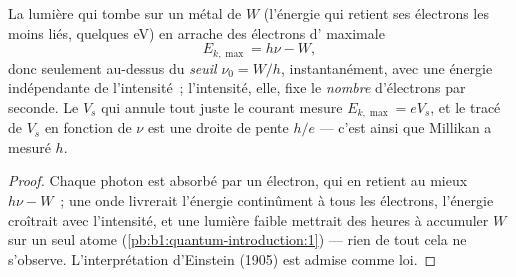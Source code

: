 \begin{proposition}\label{prop:b1:quantum-introduction:photoelectric}
La lumière qui tombe sur un métal de \emph{} $W$
(l'énergie qui retient ses électrons les moins liés, quelques eV) en
arrache des électrons d' maximale
\[
E_{k,\max} = h\nu - W ,
\]
donc seulement au-dessus du \emph{seuil} $\nu_0 = W/h$, instantanément,
avec une énergie indépendante de l'intensité~; l'intensité, elle, fixe le
\emph{nombre} d'électrons par seconde. Le \emph{}
$V_s$ qui annule tout juste le courant mesure $E_{k,\max} = eV_s$, et
le tracé de $V_s$ en fonction de $\nu$ est une droite de pente $h/e$ ---
c'est ainsi que Millikan a mesuré $h$.
\end{proposition}

\begin{proof}
Chaque photon est absorbé par un électron, qui en retient au mieux
$h\nu - W$~; une onde livrerait l'énergie continûment à tous les
électrons, l'énergie croîtrait avec l'intensité, et une lumière faible
mettrait des heures à accumuler $W$ sur un seul atome
(\cref{pb:b1:quantum-introduction:1}) --- rien de tout cela ne s'observe.
L'interprétation d'Einstein (1905) est admise comme loi.
\end{proof}

